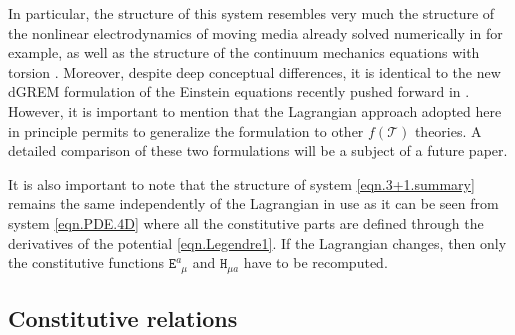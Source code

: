 \documentclass[
10pt, %
a4paper, %
oneside, %
twocolumn,
headinclude,footinclude, %
BCOR5mm, %
]{scrartcl}
\newcommand{\Hfin}[2]{\mathtt{H}_{#2#1}}	%
\newcommand{\Efin}[2]{\mathtt{E}^{#1}_{\phantom{#1}#2}}	%
\newcommand{\Tscal}{\mathcal{T}}		%
\begin{document}
	In particular, the structure of this system resembles very much the structure of the nonlinear 
	electrodynamics of 
	moving media already solved numerically in \cite{DPRZ2017} for example, as well as the 
	structure of 
	the continuum mechanics
	equations with torsion \cite{Torsion2019}. Moreover,
	despite deep conceptual differences,
	it is identical to 
	the new dGREM formulation of the Einstein equations recently pushed forward in 
	\cite{Olivares2022}.
	However, it is important to mention that the Lagrangian approach adopted here
	in principle permits to generalize the formulation to other $f(\Tscal)$ theories.
	A detailed comparison of 
	these two formulations will be a subject of a future paper.
	
	It is also important to note that the structure of system \eqref{eqn.3+1.summary} remains the 
	same 
	independently of the 
	Lagrangian in use as it can be seen from system \eqref{eqn.PDE.4D} where all the constitutive 
	parts 
	are 
	defined through the derivatives of the potential \eqref{eqn.Legendre1}. If the Lagrangian 
	changes, 
	then only the constitutive functions $ \Efin{a}{\mu} $ and $ \Hfin{a}{\mu} $ have to be 
	recomputed.
	
	\subsection{Constitutive relations}
	
\end{document}

